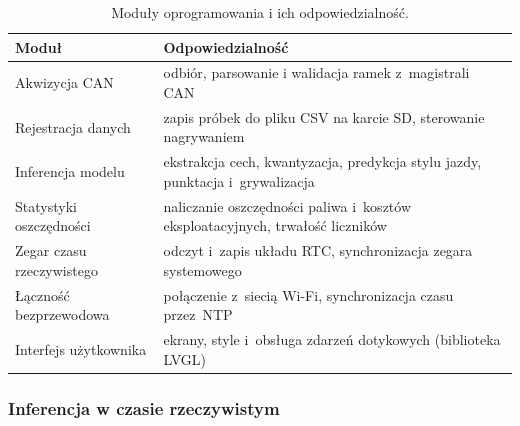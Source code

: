 \begin{table}[!h]
    \centering
    \caption{Moduły oprogramowania i ich odpowiedzialność.}
    \label{tab:moduly}
    \begin{tabular}{| p{3.6cm} | p{9.3cm} |} \hline
        \textbf{Moduł} & \textbf{Odpowiedzialność} \\ \hline\hline
        Akwizycja CAN & odbiór, parsowanie i walidacja ramek z~magistrali CAN \\ \hline
        Rejestracja danych & zapis próbek do pliku CSV na karcie SD, sterowanie nagrywaniem \\ \hline
        Inferencja modelu & ekstrakcja cech, kwantyzacja, predykcja stylu jazdy, punktacja i~grywalizacja \\ \hline
        Statystyki oszczędności & naliczanie oszczędności paliwa i~kosztów eksploatacyjnych, trwałość liczników \\ \hline
        Zegar czasu rzeczywistego & odczyt i~zapis układu RTC, synchronizacja zegara systemowego \\ \hline
        Łączność bezprzewodowa & połączenie z~siecią Wi-Fi, synchronizacja czasu przez~NTP \\ \hline
        Interfejs użytkownika & ekrany, style i~obsługa zdarzeń dotykowych (biblioteka LVGL) \\ \hline
    \end{tabular}
\end{table}

\subsubsection{Inferencja w czasie rzeczywistym}

